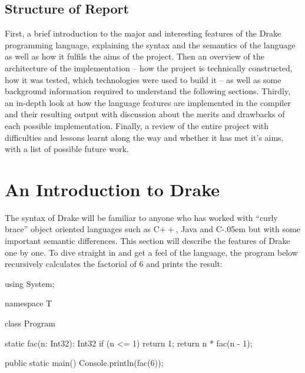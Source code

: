 \documentclass{article}
\newcommand{\sharponend}[1]{{\settoheight{\dimen0}{#1}#1\kern-.05em \resizebox{!}{\dimen0}{\raisebox{\depth}{\fontseries{b}\selectfont\#}}}}
\newcommand{\csharp}{\sharponend{C}\xspace}
\newcommand*{\cpp}{C\ensuremath{++}\xspace}
\newcommand{\plname}[0]{Drake\xspace}
\begin{document}
\subsection{Structure of Report}
First, a brief introduction to the major and interesting features of the \plname programming language, explaining the syntax and the semantics of the language as well as how it fulfils the aims of the project. Then an overview of the architecture of the implementation -- how the project is technically constructed, how it was tested, which technologies were used to build it -- as well as some background information required to understand the following sections. Thirdly, an in-depth look at how the language features are implemented in the compiler and their resulting output with discussion about the merits and drawbacks of each possible implementation. Finally, a review of the entire project with difficulties and lessons learnt along the way and whether it has met it's aims, with a list of possible future work. 

\pagebreak
\section{An Introduction to \plname}
The syntax of \plname will be familiar to anyone who has worked with ``curly brace'' object oriented languages such as \cpp, Java and \csharp but with some important semantic differences. This section will describe the features of \plname one by one. To dive straight in and get a feel of the language, the program below recursively calculates the factorial of 6 and prints the result:
\begin{sooplisting}
using System;

namespace T {
	class Program {
		static fac(n: Int32): Int32 {
			if (n <= 1)
				return 1;
			return n * fac(n - 1);
		}

		public static main() {
			Console.println(fac(6));
		}
	}
}
\end{sooplisting}
\end{document}
